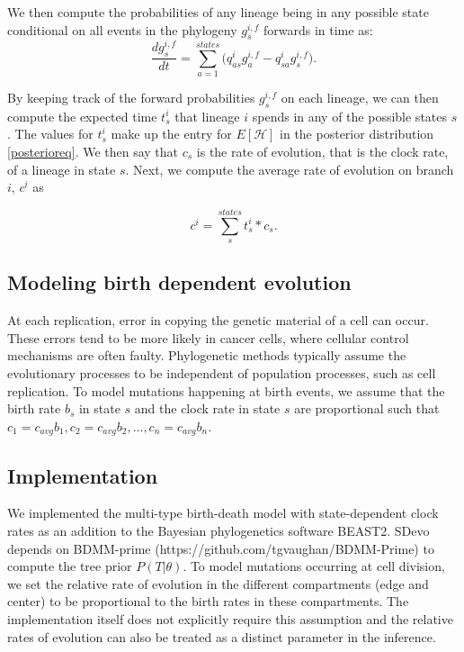 \documentclass[12pt]{elife_based}
\begin{document}
We then compute the probabilities of any lineage being in any possible state conditional on all events in the phylogeny $g^{i,f}_s$ forwards in time as:
\begin{equation*}
	\frac{dg^{i,f}_s}{dt} =  \sum_{a=1}^{states}\big(q^i_{as}g^{i,f}_a -q^i_{sa}g^{i,f}_s\big) .
\end{equation*}


By keeping track of the forward probabilities $g^{i,f}_s$ on each lineage, we can then compute the expected time $t^i_s$ that lineage $i$ spends in any of the possible states $s$. 
The values for $t^i_s$ make up the entry for $E[\mathcal{H}]$ in the posterior distribution \eqref{posterioreq}.
We then say that $c_s$ is the rate of evolution, that is the clock rate, of a lineage in state $s$.
Next, we compute the average rate of evolution on branch $i$, $c^i$ as

\begin{equation*}
    c^i = \sum_s^{states} t^i_s * c_s .
\end{equation*}

\subsection*{Modeling birth dependent evolution}
 At each replication, error in copying the genetic material of a cell can occur. 
 These errors tend to be more likely in cancer cells, where cellular control mechanisms are often faulty. 
 Phylogenetic methods typically assume the evolutionary processes to be independent of population processes, such as cell replication.
 To model mutations happening at birth events, we assume that the birth rate $b_s$ in state $s$ and the clock rate in state $s$ are proportional such that $c_1 = c_{avg}b_1, c_2=c_{avg}b_2,...,c_n=c_{avg}b_n$.
 
\subsection*{Implementation}
We implemented the multi-type birth-death model with state-dependent clock rates as an addition to the Bayesian phylogenetics software BEAST2. SDevo depends on BDMM-prime (https://github.com/tgvaughan/BDMM-Prime) to compute the tree prior $P(T|\theta)$.
To model mutations occurring at cell division, we set the relative rate of evolution in the different compartments (edge and center) to be proportional to the birth rates in these compartments.
The implementation itself does not explicitly require this assumption and the relative rates of evolution can also be treated as a distinct parameter in the inference.
\end{document}
